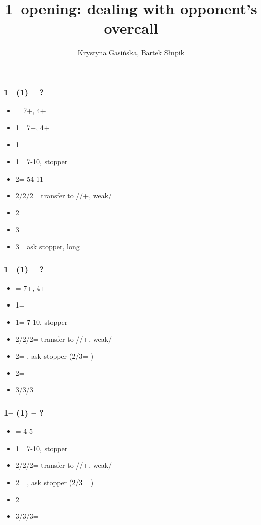 \documentclass[12pt, a4paper]{article}
\title{1\clubs\ opening: dealing with opponent's overcall}
\author{Krystyna Gasińska, Bartek Słupik}
\begin{document}
\maketitle


\subsubsection*{1\clubs -- (1\diams) -- ?}
\begin{itemize}
    \item \dbl = 7+, 4+\hearts
    \item 1\hearts = 7+, 4+\spades
    \item 1\spades = \nt
    \item 1\nt = 7-10, \diams stopper
    \item 2\clubs = 54-11
    \item 2\diams/2\hearts/2\spades = transfer to \hearts/\spades/+, weak/\gf
    \item 2\nt = \inv
    \item 3\clubs = \inv
    \item 3\diams = ask stopper, long \clubs
\end{itemize}

\subsubsection*{1\clubs -- (1\hearts) -- ?}
\begin{itemize}
    \item \dbl = 7+, 4+\spades
    \item 1\spades = \nt
    \item 1\nt = 7-10, \hearts stopper
    \item 2\clubs/2\hearts/2\spades = transfer to \diams/\spades/+, weak/\gf
    \item 2\diams = \invp, ask stopper (2\nt/3\clubs = \nf)
    \item 2\nt = \inv
    \item 3\clubs/3\diams/3\spades = \inv
\end{itemize}

\subsubsection*{1\clubs -- (1\spades) -- ?}
\begin{itemize}
    \item \dbl = 4-5\hearts
    \item 1\nt = 7-10, \spades stopper
    \item 2\clubs/2\diams/2\spades = transfer to \diams/\hearts/+, weak/\gf
    \item 2\hearts = \invp, ask stopper (2\nt/3\clubs = \nf)
    \item 2\nt = \inv
    \item 3\clubs/3\diams/3\hearts = \inv
\end{itemize}
\end{document}
